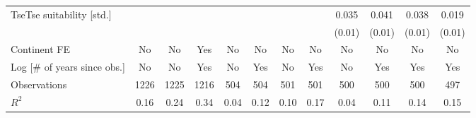 {\begin{tabular}{l*{11}{c}}
\addlinespace
TseTse suitability [std.]&                  &                  &                  &                  &                  &                  &                  &    0.035\sym{***}&    0.041\sym{***}&    0.038\sym{***}&    0.019\sym{**} \\
                &                  &                  &                  &                  &                  &                  &                  &   (0.01)         &   (0.01)         &   (0.01)         &   (0.01)         \\
\addlinespace
Continent FE    &       No         &       No         &      Yes         &       No         &       No         &       No         &       No         &       No         &       No         &       No         &       No         \\
\addlinespace
Log [\# of years since obs.]&       No         &       No         &      Yes         &       No         &      Yes         &       No         &      Yes         &       No         &      Yes         &      Yes         &      Yes         \\
\midrule
Observations    &     1226         &     1225         &     1216         &      504         &      504         &      501         &      501         &      500         &      500         &      500         &      497         \\
\(R^{2}\)       &     0.16         &     0.24         &     0.34         &     0.04         &     0.12         &     0.10         &     0.17         &     0.04         &     0.11         &     0.14         &     0.15         \\
\bottomrule
\end{tabular}
}
